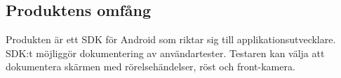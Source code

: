 \subsection{Produktens omfång}

Produkten är ett SDK för Android som riktar sig till applikationsutvecklare. SDK:t möjliggör dokumentering av användartester. Testaren kan välja att dokumentera skärmen med rörelsehändelser, röst och front-kamera.
